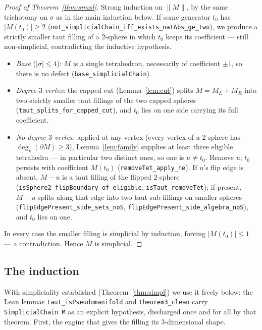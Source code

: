 \documentclass[11pt]{article}
\theoremstyle{plain}
\theoremstyle{definition}
\theoremstyle{remark}
\newcommand{\bd}{\partial}
\newcommand{\code}[1]{\texttt{#1}}
\newcommand{\card}[1]{\lvert #1\rvert}
\newcommand{\norm}[1]{\lVert #1\rVert}
\begin{document}
\begin{proof}[Proof of Theorem~\ref{thm:simpl}]
Strong induction on $\norm M$, by the same trichotomy on $\sigma$ as in the main induction
below. If some generator $t_0$ has $\card{M(t_0)}\ge 2$
(\code{not\_simplicialChain\_iff\_exists\_natAbs\_ge\_two}), we produce a strictly smaller taut
filling of a $2$-sphere in which $t_0$ keeps its coefficient --- still non-simplicial,
contradicting the inductive hypothesis.
\begin{itemize}
\item \emph{Base} ($\card{\sigma}\le 4$): $M$ is a single tetrahedron, necessarily of
coefficient $\pm1$, so there is no defect (\code{base\_simplicialChain}).
\item \emph{Degree-$3$ vertex}: the capped cut (Lemma~\ref{lem:cut}) splits $M=M_L+M_R$ into
two strictly smaller taut fillings of the two capped spheres
(\code{taut\_splits\_for\_capped\_cut}), and $t_0$ lies on one side carrying its full
coefficient.
\item \emph{No degree-$3$ vertex}: applied at any vertex (every vertex of a $2$-sphere has
$\deg_v(\bd M)\ge 3$), Lemma~\ref{lem:family} supplies at least three eligible tetrahedra ---
in particular two distinct ones, so one is $u\neq t_0$. Remove $u$; $t_0$ persists with
coefficient $M(t_0)$
(\code{removeTet\_apply\_ne}). If $u$'s flip edge is absent, $M-u$ is a taut filling of the
flipped $2$-sphere (\code{isSphere2\_flipBoundary\_of\_eligible},
\code{isTaut\_removeTet}); if present, $M-u$ splits along that edge into two taut sub-fillings
on smaller spheres (\code{flipEdgePresent\_side\_sets\_noS},
\code{flipEdgePresent\_side\_algebra\_noS}), and $t_0$ lies on one.
\end{itemize}
In every case the smaller filling is simplicial by induction, forcing $\card{M(t_0)}\le 1$ ---
a contradiction. Hence $M$ is simplicial.
\end{proof}

\subsection*{The induction}

With simpliciality established (Theorem~\ref{thm:simpl}) we use it freely below: the Lean
lemmas \code{taut\_isPseudomanifold} and \code{theorem3\_clean} carry \code{SimplicialChain M}
as an explicit hypothesis, discharged once and for all by that theorem. First, the engine that
gives the filling its $3$-dimensional shape.
\end{document}
